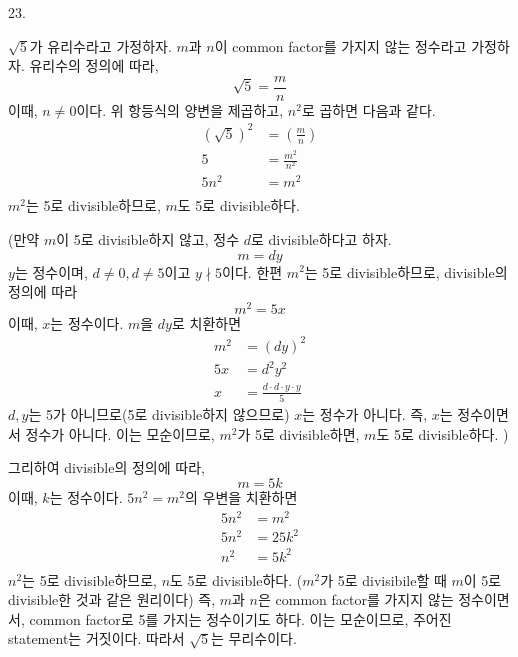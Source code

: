 \documentclass{article}
\begin{document}
23.
\begin{addmargin}[1em]{2em}
$\sqrt{5}$가 유리수라고 가정하자. $m$과 $n$이 common factor를 가지지 않는 정수라고 가정하자. 유리수의 정의에 따라,
\[\sqrt{5} = \frac{m}{n}\]
이때, $n\ne 0$이다. 위 항등식의 양변을 제곱하고, $n^2$로 곱하면 다음과 같다.
\begin{align*}
    (\sqrt{5})^2 &= \left (\frac{m}{n} \right ) \\
    5 &= \frac{m^2}{n^2} \\ 
    5n^2 &= m^2 \\
\end{align*}
$m^2$는 5로 divisible하므로, $m$도 5로 divisible하다. 
\newline

(만약 $m$이 5로 divisible하지 않고, 정수 $d$로 divisible하다고 하자.
\[m=dy\]
$y$는 정수이며, $d \ne 0, d \ne 5$이고 $y \nmid 5$이다. 한편 $m^2$는 5로 divisible하므로, divisible의 정의에 따라
\[m^2=5x\]
이때, $x$는 정수이다. $m$을 $dy$로 치환하면
\begin{align*}
    m^2&=(dy)^2\\
    5x&=d^2y^2\\
    x &= \frac{d\cdot d\cdot y\cdot y}{5}
\end{align*}
$d, y$는 5가 아니므로(5로 divisible하지 않으므로) $x$는 정수가 아니다. 즉, $x$는 정수이면서 정수가 아니다. 이는 모순이므로, $m^2$가 5로 divisible하면, $m$도 5로 divisible하다. )
\newline

그리하여 divisible의 정의에 따라, 
\[m=5k\]
이때, $k$는 정수이다. $5n^2=m^2$의 우변을 치환하면
\begin{align*}
    5n^2 &= m^2 \\
    5n^2 &= 25k^2 \\
    n^2 &= 5k^2 \\
\end{align*}
$n^2$는 5로 divisible하므로, $n$도 5로 divisible하다. ($m^2$가 5로 divisibile할 때 $m$이 5로 divisible한 것과 같은 원리이다)
\newline
즉, $m$과 $n$은 common factor를 가지지 않는 정수이면서, common factor로 5를 가지는 정수이기도 하다. 이는 모순이므로, 주어진 statement는 거짓이다. 따라서 $\sqrt{5}$는 무리수이다.
\end{addmargin}
\bigskip
\end{document}
